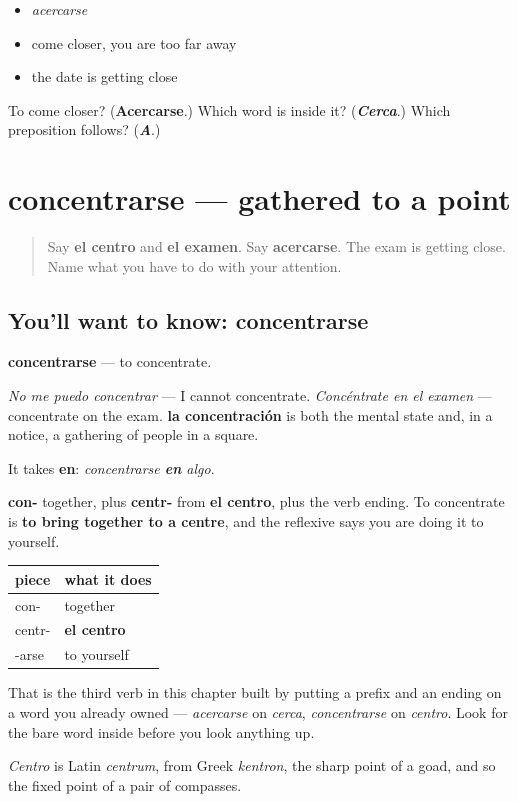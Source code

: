 \begin{itemize}
\raggedright
  \item \emph{acercarse}
  \item come closer, you are too far away
  \item the date is getting close
\end{itemize}

\begin{tcolorbox}[breakable,colback=teal!4,colframe=teal!35!black,title={Before you move on}]
To come closer? (\textbf{Acercarse}.) Which word is inside it? (\emph{\textbf{Cerca}}.) Which preposition follows? (\emph{\textbf{A}}.)
\end{tcolorbox}
\section[concentrarse]{concentrarse — gathered to a point}

\label{lesson:ES-C443-concentrarse}



\begin{quote}
Say \textbf{el centro} and \textbf{el examen}. Say \textbf{acercarse}. The exam is getting close. Name what you have to do with your attention.
\end{quote}

\subsection*{You'll want to know: concentrarse}
\textbf{concentrarse} — to concentrate.

\emph{No me puedo concentrar} — I cannot concentrate. \emph{Concéntrate en el examen} — concentrate on the exam. \textbf{la concentración} is both the mental state and, in a notice, a gathering of people in a square.

It takes \textbf{en}: \emph{concentrarse \textbf{en} algo}.

\begin{cousinweb}
\textbf{con-} together, plus \textbf{centr-} from \textbf{el centro}, plus the verb ending. To concentrate is \textbf{to bring together to a centre}, and the reflexive says you are doing it to yourself.

\noindent
\begin{tabularx}{\linewidth}{@{}>{\raggedright\arraybackslash}X>{\raggedright\arraybackslash}X@{}}
\toprule
\textbf{piece} & \textbf{what it does} \\
\midrule
con- & together \\
centr- & \textbf{el centro} \\
-arse & to yourself \\
\bottomrule
\end{tabularx}

That is the third verb in this chapter built by putting a prefix and an ending on a word you already owned — \emph{acercarse} on \emph{cerca}, \emph{concentrarse} on \emph{centro}. Look for the bare word inside before you look anything up.

\emph{Centro} is Latin \emph{centrum}, from Greek \emph{kentron}, the sharp point of a goad, and so the fixed point of a pair of compasses.
\end{cousinweb}

